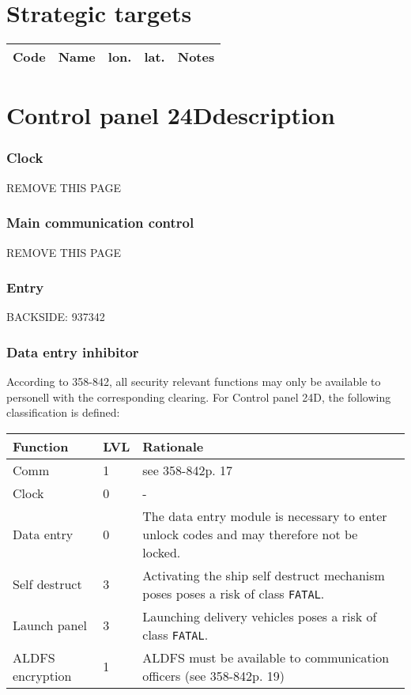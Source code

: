 \documentclass[a4paper]{article}
\newcommand{\secnorm}{358-842}
\newcommand{\cockpit}{Control panel 24D}
\newcommand{\fatalrisk}{\texttt{FATAL}}
\begin{document}
\tableofcontents

\part{Strategic targets}

\begin{longtable}{p{2cm}p{3cm}|p{1cm}p{1cm}|p{6cm}}
Code & Name & lon. & lat. & Notes \\\hline	\endfirsthead
\end{longtable}

\clearpage
\part{\cockpit description}

\clearpage
\section{Clock}
REMOVE THIS PAGE

\clearpage
\section{Main communication control}
REMOVE THIS PAGE


\clearpage
\section{Entry}

BACKSIDE: 937342

\section{Data entry inhibitor}

According to \secnorm, all security relevant functions may only be available to personell with the corresponding clearing.
For \cockpit, the following classification is defined:

\begin{longtable}{p{3cm}p{1cm}p{8cm}}
Function & LVL & Rationale \\\hline\endfirsthead
Comm & 1 & see \secnorm p. 17 \\
Clock & 0 & - \\
Data entry & 0 & The data entry module is necessary to enter unlock codes and may therefore not be locked. \\
Self destruct & 3 & Activating the ship self destruct mechanism poses poses a risk of class \fatalrisk. \\
Launch panel & 3 & Launching delivery vehicles poses a risk of class \fatalrisk. \\
ALDFS encryption & 1 & ALDFS must be available to communication officers (see \secnorm p. 19)
\end{longtable}
\end{document}
